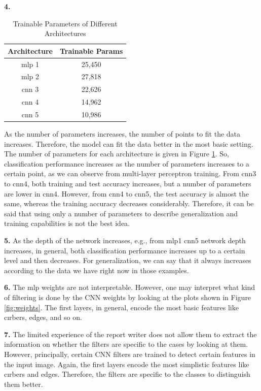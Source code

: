 \documentclass{assignment}
\begin{document}
\textbf{4.}

\begin{table}[h]
    \centering
    \begin{tabular}{|c|c|}
    \hline
    \textbf{Architecture} & \textbf{Trainable Params} \\
    \hline
    mlp 1 & 25,450 \\
    mlp 2 & 27,818 \\
    cnn 3 & 22,626 \\
    cnn 4 & 14,962 \\
    cnn 5 & 10,986 \\
    \hline
    \end{tabular}
    \caption{Trainable Parameters of Different Architectures}
    \label{table:TrinableParams}
\end{table}


\noindent As the number of parameters increases, the number of points to fit the data increases. Therefore, the model can fit the data better in the most basic setting. The number of parameters for each architecture is given in Figure \ref{table:TrinableParams}. So, classification performance increases as the number of parameters increases to a certain point, as we can observe from multi-layer perceptron training. From cnn3 to cnn4, both training and test accuracy increases, but a number of parameters are lower in cnn4. However, from cnn4 to cnn5, the test accuracy is almost the same, whereas the training accuracy decreases considerably. Therefore, it can be said that using only a number of parameters to describe generalization and training capabilities is not the best idea. 

\textbf{5.}
\noindent As the depth of the network increases, e.g., from mlp1 cnn5 network depth increases, in general, both classification performance increases up to a certain level and then decreases. For generalization, we can say that it always increases according to the data we have right now in those examples. 


\textbf{6.}
\noindent The mlp weights are not interpretable. However, one may interpret what kind of filtering is done by the CNN weights by looking at the plots shown in Figure \ref{fig:weights}. The first layers, in general, encode the most basic features like cırbers, edges, and so on.

\textbf{7.}
\noindent The limited experience of the report writer does not allow them to extract the information on whether the filters are specific to the cases by looking at them. However, principally, certain CNN filters are trained to detect certain features in the input image. Again, the first layers encode the most simplistic features like cırbers and edges. Therefore, the filters are specific to the classes to distinguish them better. 
\end{document}
